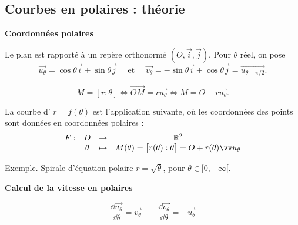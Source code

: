 \documentclass[10pt,class=article,crop=false]{standalone}
\begin{document}
\begin{multicols}{2}
\begin{enumerate}
\end{enumerate}


\subsection{Courbes en polaires : théorie}


\textbf{Coordonnées polaires}


Le plan est rapporté à un repère orthonormé
$(O,\overrightarrow{i},\overrightarrow{j})$. Pour $\theta$ réel,
on pose
$$\overrightarrow{u_\theta}=\cos\theta\overrightarrow{i}+\sin\theta\overrightarrow{j}
\quad \text{ et  } \quad
\overrightarrow{v_\theta}=-\sin\theta\overrightarrow{i}+\cos\theta\overrightarrow{j}
=\overrightarrow{u_{\theta+\pi/2}}.$$

$$M = [r:\theta]
\iff \overrightarrow{OM} =r\overrightarrow{u_\theta}
\iff M=O+r\overrightarrow{u_\theta}.$$




La courbe d' $r=f(\theta)$
est l'application suivante, où les coordonnées des
points sont données en coordonnées polaires :
$$\begin{array}{cccc}
	F :&D&\rightarrow&\Rr^2\\
	&\theta&\mapsto&M(\theta) = \big[r(\theta):\theta\big] = O+r(\theta)\vec{u}_\theta
\end{array}
$$



Exemple. Spirale d'équation polaire $r = \sqrt{\theta}$, pour $\theta \in [0,+\infty[$.





\textbf{Calcul de la vitesse en polaires}

$$\frac{\dd\overrightarrow{u_\theta}}{\dd\theta}
=\overrightarrow{v_\theta} \qquad\frac{\dd\overrightarrow{v_\theta}}{\dd\theta}
=-\overrightarrow{u_\theta}$$



\end{multicols}
\end{document}
